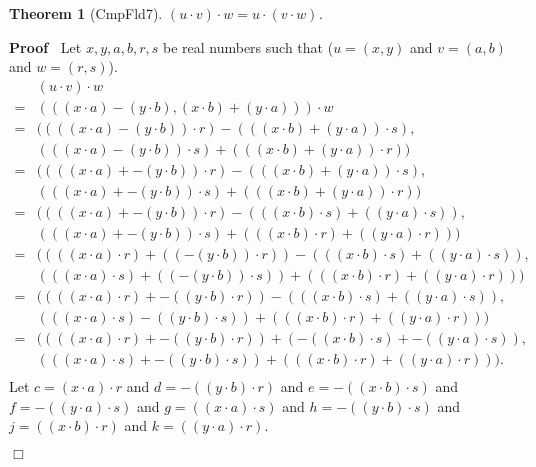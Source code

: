 \documentclass{article}
\newenvironment{forthel}{\begin{leftbar}}{\end{leftbar}}
\newenvironment{proof}{\noindent\textbf{Proof\ }}{\hspace*{\fill}$\Box$\medskip}
\newtheorem{theorem}{Theorem}
\newcommand{\cmul}{\cdot}
\begin{document}
\begin{forthel}
\begin{theorem}[CmpFld7] $(u \cmul v) \cmul w = u \cmul (v \cmul w)$.
\end{theorem}\begin{proof}
 Let $x,y,a,b,r,s$ be real numbers such that ($u = (x,y)$ and $v = (a,b)$ and $w = (r,s)$).\newline 
\begin{align*}
&(u \cmul v) \cmul w \\
= &(((x \cdot a) - (y \cdot b), (x \cdot b) + (y \cdot a)))  \cmul  w \\
= &(  ( ((x \cdot a)  - (y \cdot b)) \cdot r ) - ( ((x \cdot b) + (y \cdot a)) \cdot s )  ,\\
  &( ((x \cdot a)  - (y \cdot b)) \cdot s ) + ( ((x \cdot b) + (y \cdot a)) \cdot r ) )\\
= &(  ( ((x \cdot a) + -(y \cdot b)) \cdot r ) - ( ((x \cdot b) + (y \cdot a)) \cdot s )  ,  \\
  &( ((x \cdot a) + -(y \cdot b)) \cdot s ) + ( ((x \cdot b) + (y \cdot a)) \cdot r ) )\\
= &(  ( ((x \cdot a) + -(y \cdot b)) \cdot r ) - ( ((x \cdot b) \cdot s) + ((y \cdot a) \cdot s) )  , \\
  &( ((x \cdot a) + -(y \cdot b)) \cdot s ) + ( ((x \cdot b) \cdot r) + ((y \cdot a) \cdot r) )  )\\
= &(  ( ((x \cdot a) \cdot r) + ((-(y \cdot b)) \cdot r) ) - ( ((x \cdot b) \cdot s) + ((y \cdot a) \cdot s) )  ,  \\
  &( ((x \cdot a) \cdot s) + ((-(y \cdot b)) \cdot s) ) + ( ((x \cdot b) \cdot r) + ((y \cdot a) \cdot r) )  )\\ 
= &(  ( ((x \cdot a) \cdot r) + -((y \cdot b) \cdot r) ) - ( ((x \cdot b) \cdot s) + ((y \cdot a) \cdot s) )  ,  \\
  &( ((x \cdot a) \cdot s) - ((y \cdot b) \cdot s) ) + ( ((x \cdot b) \cdot r) + ((y \cdot a) \cdot r) )  )\\
= &(  ( ((x \cdot a) \cdot r) + -((y \cdot b) \cdot r) ) + ( -((x \cdot b) \cdot s) + -((y \cdot a) \cdot s) )  ,  \\
  &( ((x \cdot a) \cdot s) + -((y \cdot b) \cdot s) ) + ( ((x \cdot b) \cdot r) + ((y \cdot a) \cdot r) )  ).\\
\end{align*}
Let $c = (x \cdot a) \cdot r$ and $d = -((y \cdot b) \cdot r)$ and $e = -((x \cdot b) \cdot s)$ and $f = -((y \cdot a) \cdot s)$ and $g = ((x \cdot a) \cdot s)$ and  $h = -((y \cdot b) \cdot s)$ and  $j = ((x \cdot b) \cdot r)$ and $k = ((y \cdot a) \cdot r)$.\newline

\end{proof}
\end{forthel}
\end{document}
